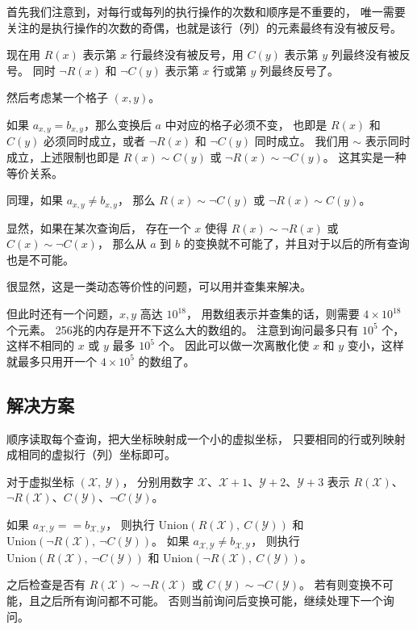 \documentclass[withoutpreface,bwprint]{cumcmthesis}
\begin{document}
首先我们注意到，对每行或每列的执行操作的次数和顺序是不重要的，
唯一需要关注的是执行操作的次数的奇偶，也就是该行（列）的元素最终有没有被反号。

现在用 $R(x)$ 表示第 $x$ 行最终没有被反号，用 $C(y)$ 表示第 $y$ 列最终没有被反号。
同时 $\neg R(x)$ 和 $\neg C(y)$ 表示第 $x$ 行或第 $y$ 列最终反号了。

然后考虑某一个格子 $(x,y)$。

如果 $a_{x,y} = b_{x,y}$，那么变换后 $a$ 中对应的格子必须不变，
也即是 $R(x)$ 和 $C(y)$ 必须同时成立，或者 $\neg R(x)$ 和 $\neg C(y)$ 同时成立。
我们用 $\sim$ 表示同时成立，上述限制也即是 $R(x) \sim C(y)$ 或 $\neg{}R(x)\sim\neg{}C(y)$。
这其实是一种等价关系。

同理，如果 $a_{x,y} \ne b_{x,y}$，
那么 $R(x) \sim\neg C(y)$ 或 $\neg{}R(x)\sim{}C(y)$。

显然，如果在某次查询后，
存在一个 $x$ 使得 $R(x)\sim\neg{}R(x)$ 或 $C(x)\sim\neg{}C(x)$，
那么从 $a$ 到 $b$ 的变换就不可能了，并且对于以后的所有查询也是不可能。

很显然，这是一类动态等价性的问题，可以用并查集来解决。

但此时还有一个问题，$x,y$ 高达 $10^{18}$，
用数组表示并查集的话，则需要 $4\times{}10^{18}$ 个元素。
256兆的内存是开不下这么大的数组的。
注意到询问最多只有 $10^5$ 个，这样不相同的 $x$ 或 $y$ 最多 $10^5$ 个。
因此可以做一次离散化使 $x$ 和 $y$ 变小，这样就最多只用开一个 $4\times{}10^5$ 的数组了。

\subsection{解决方案}

顺序读取每个查询，把大坐标映射成一个小的虚拟坐标，
只要相同的行或列映射成相同的虚拟行（列）坐标即可。

\newcommand\mX{\mathscr{X}}
\newcommand\mY{\mathscr{Y}}
\newcommand\mU{\mathrm{Union}}
\newcommand\mF{\mathrm{Find}}

对于虚拟坐标 $(\mX,\:\mY)$，
分别用数字
$\mX$、$\mX+1$、$\mY+2$、$\mY+3$
表示
$R(\mX)$、$\neg{}R(\mX)$、$C(\mY)$、$\neg{}C(\mY)$。

如果 $a_{\mX,\mY} == b_{\mX,\mY}$，
则执行 $\mU(R(\mX),\:{}C(\mY))$ 和 $\mU(\neg{}R(\mX),\:\neg{}C(\mY))$。
如果 $a_{\mX,\mY} \ne b_{\mX,\mY}$，
则执行 $\mU(R(\mX),\:\neg{}C(\mY))$ 和 $\mU(\neg{}R(\mX),\:{}C(\mY))$。

之后检查是否有 $R(\mX)\sim\neg{}R(\mX)$ 或 $C(\mY)\sim\neg{}C(\mY)$。
若有则变换不可能，且之后所有询问都不可能。
否则当前询问后变换可能，继续处理下一个询问。
\end{document}
